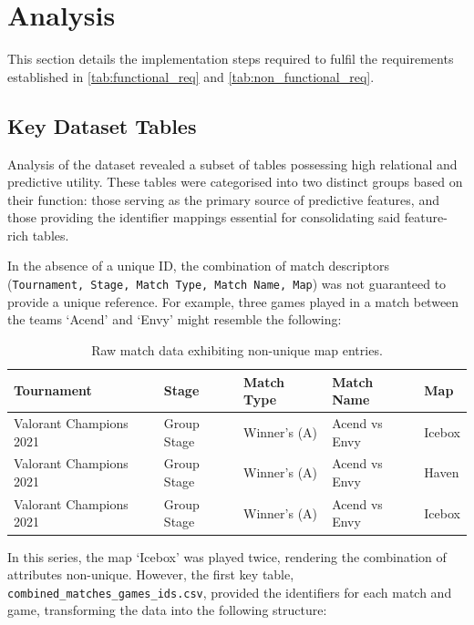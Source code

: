 \section{Analysis}
This section details the implementation steps required to fulfil the requirements established in \autoref{tab:functional_req} and \autoref{tab:non_functional_req}. 

\subsection{Key Dataset Tables}
\label{sub:key-tables}
Analysis of the dataset revealed a subset of tables possessing high relational and predictive utility. These tables were categorised into two distinct groups based on their function: those serving as the primary source of predictive features, and those providing the identifier mappings essential for consolidating said feature-rich tables. 

In the absence of a unique ID, the combination of match descriptors (\texttt{Tournament, Stage, Match Type, Match Name, Map}) was not guaranteed to provide a unique reference. For example, three games played in a match between the teams `Acend' and `Envy' might resemble the following:

\begin{table}[H]
\centering
\small
\begin{tabular}{lllll}
\toprule
\textbf{Tournament} & \textbf{Stage} & \textbf{Match Type} & \textbf{Match Name} & \textbf{Map} \\
\midrule
Valorant Champions 2021 & Group Stage & Winner's (A) & Acend vs Envy & Icebox \\
Valorant Champions 2021 & Group Stage & Winner's (A) & Acend vs Envy & Haven \\
Valorant Champions 2021 & Group Stage & Winner's (A) & Acend vs Envy & Icebox \\
\bottomrule
\end{tabular}
\caption{Raw match data exhibiting non-unique map entries.}
\label{tab:raw_match_data}
\end{table}

In this series, the map `Icebox' was played twice, rendering the combination of attributes non-unique. However, the first key table, \texttt{combined\_matches\_games\_ids.csv}, provided the identifiers for each match and game, transforming the data into the following structure:


